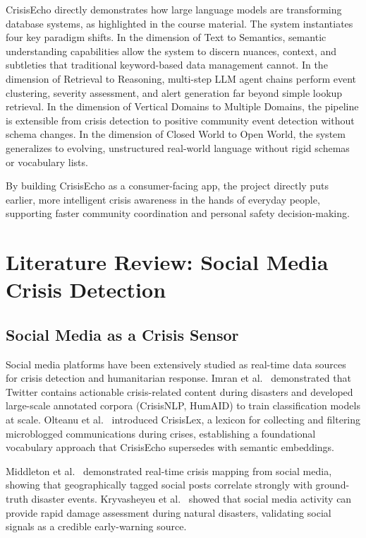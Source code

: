 \documentclass[conference]{IEEEtran}
\begin{document}
CrisisEcho directly demonstrates how large language models are transforming
database systems, as highlighted in the course material. The system instantiates
four key paradigm shifts. In the dimension of Text to Semantics, semantic
understanding capabilities allow the system to discern nuances, context, and
subtleties that traditional keyword-based data management cannot. In the dimension
of Retrieval to Reasoning, multi-step LLM agent chains perform event clustering,
severity assessment, and alert generation far beyond simple lookup retrieval.
In the dimension of Vertical Domains to Multiple Domains, the pipeline is
extensible from crisis detection to positive community event detection without
schema changes. In the dimension of Closed World to Open World, the system
generalizes to evolving, unstructured real-world language without rigid schemas
or vocabulary lists.

By building CrisisEcho as a consumer-facing app, the project directly puts
earlier, more intelligent crisis awareness in the hands of everyday people,
supporting faster community coordination and personal safety decision-making.

\section{Literature Review: Social Media Crisis Detection}

\subsection{Social Media as a Crisis Sensor}

Social media platforms have been extensively studied as real-time data sources
for crisis detection and humanitarian response. Imran et al.~\cite{imran2016twitter}
demonstrated that Twitter contains actionable crisis-related content during
disasters and developed large-scale annotated corpora (CrisisNLP, HumAID) to
train classification models at scale. Olteanu et al.~\cite{olteanu2014crisislex}
introduced CrisisLex, a lexicon for collecting and filtering microblogged
communications during crises, establishing a foundational vocabulary approach
that CrisisEcho supersedes with semantic embeddings.

Middleton et al.~\cite{middleton2014real} demonstrated real-time crisis mapping
from social media, showing that geographically tagged social posts correlate
strongly with ground-truth disaster events. Kryvasheyeu et al.~\cite{kryvasheyeu2016rapid}
showed that social media activity can provide rapid damage assessment during
natural disasters, validating social signals as a credible early-warning source.
\end{document}
